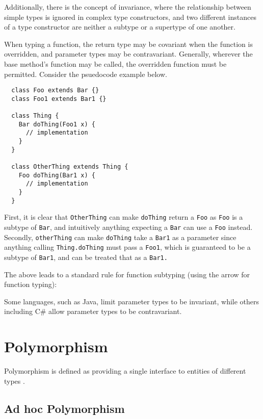 Additionally, there is the concept of invariance, where the relationship between simple types is ignored in complex type constructors, and two different instances of a type constructor are neither a subtype or a supertype of one another.

When typing a function, the return type may be covariant when the function is overridden, and parameter types may be contravariant. Generally, wherever the base method's function may be called, the overridden function must be permitted.
Consider the psuedocode example below.

\begin{verbatim}
  class Foo extends Bar {}
  class Foo1 extends Bar1 {}

  class Thing {
    Bar doThing(Foo1 x) { 
      // implementation
    }
  }

  class OtherThing extends Thing {
    Foo doThing(Bar1 x) {
      // implementation
    }
  }
\end{verbatim}
First, it is clear that \texttt{OtherThing} can make \texttt{doThing} return a \texttt{Foo} as \texttt{Foo} is a subtype of \texttt{Bar}, and intuitively anything expecting a \texttt{Bar} can use a \texttt{Foo} instead. Secondly, \texttt{otherThing} can make \texttt{doThing} take a \texttt{Bar1} as a parameter since anything calling \texttt{Thing.doThing} must pass a \texttt{Foo1}, which is guaranteed to be a subtype of \texttt{Bar1}, and can be treated that as a \texttt{Bar1.}

The above leads to a standard rule for function subtyping (using the arrow for function typing):

\begin{mathpar}
\end{mathpar}

Some languages, such as Java, limit parameter types to be invariant, while others including C\# allow parameter types to be contravariant.

\section{Polymorphism} \label{polymorphism}

Polymorphism is defined as providing a single interface to entities of different types \cite{Stroustrup}. 

\subsection{Ad hoc Polymorphism}

